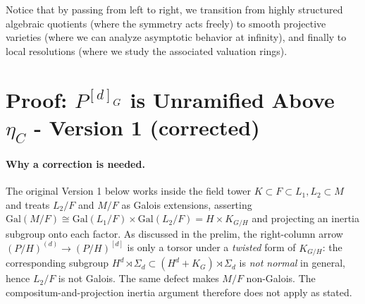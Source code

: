 \vspace{1em}
\begin{center}
\end{center}
\vspace{1em}

Notice that by passing from left to right, we transition from highly structured algebraic quotients (where the symmetry acts freely) to smooth projective varieties (where we can analyze asymptotic behavior at infinity), and finally to local resolutions (where we study the associated valuation rings).



\begingroup\color{blue}
\section*{Proof: $P^{[d]_G}$ is Unramified Above $\eta_C$ - Version 1 (corrected)}

\paragraph{Why a correction is needed.} The original Version 1 below works inside the field tower $K \subset F \subset L_1, L_2 \subset M$ and treats $L_2/F$ and $M/F$ as Galois extensions, asserting $\mathrm{Gal}(M/F) \cong \mathrm{Gal}(L_1/F) \times \mathrm{Gal}(L_2/F) = H \times K_{G/H}$ and projecting an inertia subgroup onto each factor. As discussed in the prelim, the right-column arrow $(P/H)^{(d)} \to (P/H)^{[d]}$ is only a torsor under a \emph{twisted} form of $K_{G/H}$: the corresponding subgroup $H^d \rtimes \Sigma_d \subset (H^d + K_G)\rtimes \Sigma_d$ is \emph{not normal} in general, hence $L_2/F$ is not Galois. The same defect makes $M/F$ non-Galois. The compositum-and-projection inertia argument therefore does not apply as stated.

